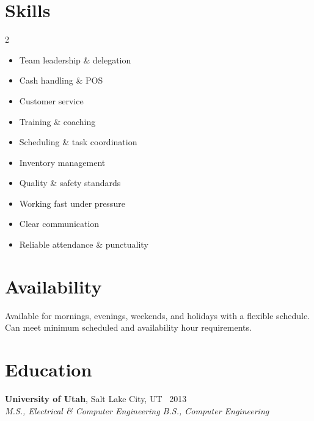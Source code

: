 \documentclass[10.5pt, letterpaper]{article}
\newcommand{\jobentry}[4]{%
  \noindent
  \textbf{\color{accent}#1}\textcolor{muted}{, #2 \textbullet\ #4}\\
  \textit{#3}%
}
\begin{document}
\section{Skills}

\begin{multicols}{2}
\begin{itemize}
  \item Team leadership \& delegation
  \item Cash handling \& POS
  \item Customer service
  \item Training \& coaching
  \item Scheduling \& task coordination
  \item Inventory management
  \item Quality \& safety standards
  \item Working fast under pressure
  \item Clear communication
  \item Reliable attendance \& punctuality
\end{itemize}
\end{multicols}

\section{Availability}

\noindent
Available for mornings, evenings, weekends, and holidays with a flexible schedule.
Can meet minimum scheduled and availability hour requirements.

\section{Education}

\jobentry{University of Utah}{Salt Lake City, UT}%
  {M.S., Electrical \& Computer Engineering \enspace\textbullet\enspace B.S., Computer Engineering}{2013}
\end{document}
